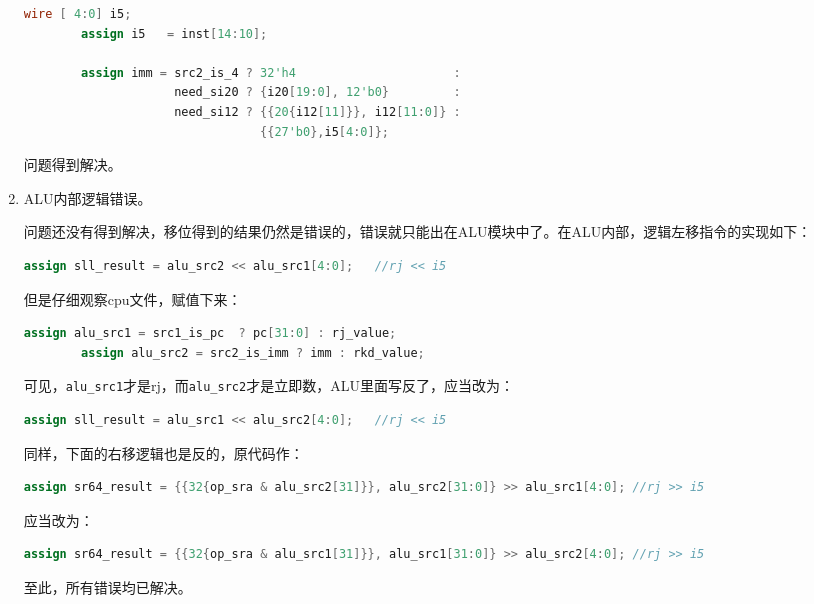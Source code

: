 \documentclass[UTF8]{article}
\begin{document}
\begin{enumerate}
    \begin{lstlisting}[language=Verilog]
        wire [ 4:0] i5;
        assign i5   = inst[14:10];

        assign imm = src2_is_4 ? 32'h4                      :
                     need_si20 ? {i20[19:0], 12'b0}         :
                     need_si12 ? {{20{i12[11]}}, i12[11:0]} :
                                 {{27'b0},i5[4:0]}; 
    \end{lstlisting}

    问题得到解决。

    \item ALU内部逻辑错误。
    
    问题还没有得到解决，移位得到的结果仍然是错误的，错误就只能出在ALU模块中了。在ALU内部，逻辑左移指令的实现如下：

    \begin{lstlisting}[language=Verilog]
        assign sll_result = alu_src2 << alu_src1[4:0];   //rj << i5
    \end{lstlisting}

    但是仔细观察cpu文件，赋值下来：

    \begin{lstlisting}[language=Verilog]
        assign alu_src1 = src1_is_pc  ? pc[31:0] : rj_value;
        assign alu_src2 = src2_is_imm ? imm : rkd_value;
    \end{lstlisting}

    可见，\texttt{alu\_src1}才是rj，而\texttt{alu\_src2}才是立即数，ALU里面写反了，应当改为：

    \begin{lstlisting}[language=Verilog]
        assign sll_result = alu_src1 << alu_src2[4:0];   //rj << i5
    \end{lstlisting}

    同样，下面的右移逻辑也是反的，原代码作：

    \begin{lstlisting}[language=Verilog]
        assign sr64_result = {{32{op_sra & alu_src2[31]}}, alu_src2[31:0]} >> alu_src1[4:0]; //rj >> i5
    \end{lstlisting}

    应当改为：

    \begin{lstlisting}[language=Verilog]
        assign sr64_result = {{32{op_sra & alu_src1[31]}}, alu_src1[31:0]} >> alu_src2[4:0]; //rj >> i5
    \end{lstlisting}

    至此，所有错误均已解决。
\end{enumerate}
\end{document}
